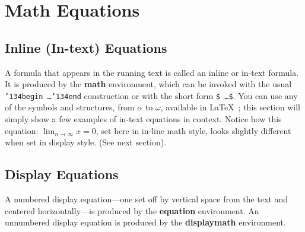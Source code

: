 \documentclass[sigconf, authorversion, nonacm, screen]{acmart}
\begin{document}

\section{Math Equations}


\subsection{Inline (In-text) Equations}
A formula that appears in the running text is called an inline or
in-text formula.  It is produced by the \textbf{math} environment,
which can be invoked with the usual
\texttt{{\char'134}begin\,\ldots{\char'134}end} construction or with
the short form \texttt{\$\,\ldots\$}. You can use any of the symbols
and structures, from $\alpha$ to $\omega$, available in
\LaTeX~\cite{Lamport:LaTeX}; this section will simply show a few
examples of in-text equations in context. Notice how this equation:
\begin{math}
  \lim_{n\rightarrow \infty}x=0
\end{math},
set here in in-line math style, looks slightly different when
set in display style.  (See next section).

\subsection{Display Equations}
A numbered display equation---one set off by vertical space from the
text and centered horizontally---is produced by the \textbf{equation}
environment. An unnumbered display equation is produced by the
\textbf{displaymath} environment.
\end{document}
